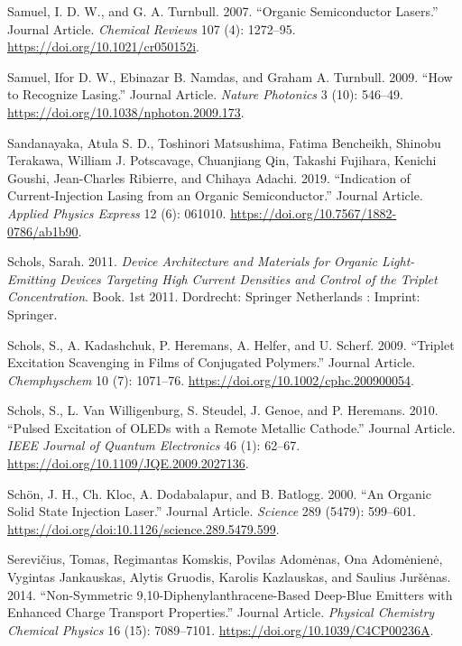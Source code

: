 \documentclass[
  letterpaper,
  DIV=11,
  numbers=noendperiod,
  oneside]{scrreprt}
\newlength{\cslhangindent}
\newlength{\cslentryspacingunit} %
\newenvironment{CSLReferences}[2] %
 {%
  \setlength{\parindent}{0pt}
  \ifodd #1
  \let\oldpar\par
  \def\par{\hangindent=\cslhangindent\oldpar}
  \fi
  \setlength{\parskip}{#2\cslentryspacingunit}
 }%
 {}
\begin{document}
\begin{CSLReferences}{1}{0}
\leavevmode{}%
Samuel, I. D. W., and G. A. Turnbull. 2007. {``Organic Semiconductor
Lasers.''} Journal Article. \emph{Chemical Reviews} 107 (4): 1272--95.
\url{https://doi.org/10.1021/cr050152i}.

\leavevmode{}%
Samuel, Ifor D. W., Ebinazar B. Namdas, and Graham A. Turnbull. 2009.
{``How to Recognize Lasing.''} Journal Article. \emph{Nature Photonics}
3 (10): 546--49. \url{https://doi.org/10.1038/nphoton.2009.173}.

\leavevmode{}%
Sandanayaka, Atula S. D., Toshinori Matsushima, Fatima Bencheikh,
Shinobu Terakawa, William J. Potscavage, Chuanjiang Qin, Takashi
Fujihara, Kenichi Goushi, Jean-Charles Ribierre, and Chihaya Adachi.
2019. {``Indication of Current-Injection Lasing from an Organic
Semiconductor.''} Journal Article. \emph{Applied Physics Express} 12
(6): 061010. \url{https://doi.org/10.7567/1882-0786/ab1b90}.

\leavevmode{}%
Schols, Sarah. 2011. \emph{Device Architecture and Materials for Organic
Light-Emitting Devices Targeting High Current Densities and Control of
the Triplet Concentration}. Book. 1st 2011. Dordrecht: Springer
Netherlands : Imprint: Springer.

\leavevmode{}%
Schols, S., A. Kadashchuk, P. Heremans, A. Helfer, and U. Scherf. 2009.
{``Triplet Excitation Scavenging in Films of Conjugated Polymers.''}
Journal Article. \emph{Chemphyschem} 10 (7): 1071--76.
\url{https://doi.org/10.1002/cphc.200900054}.

\leavevmode{}%
Schols, S., L. Van Willigenburg, S. Steudel, J. Genoe, and P. Heremans.
2010. {``Pulsed Excitation of OLEDs with a Remote Metallic Cathode.''}
Journal Article. \emph{IEEE Journal of Quantum Electronics} 46 (1):
62--67. \url{https://doi.org/10.1109/JQE.2009.2027136}.

\leavevmode{}%
Schön, J. H., Ch. Kloc, A. Dodabalapur, and B. Batlogg. 2000. {``An
Organic Solid State Injection Laser.''} Journal Article. \emph{Science}
289 (5479): 599--601.
\url{https://doi.org/doi:10.1126/science.289.5479.599}.

\leavevmode{}%
Serevičius, Tomas, Regimantas Komskis, Povilas Adomėnas, Ona Adomėnienė,
Vygintas Jankauskas, Alytis Gruodis, Karolis Kazlauskas, and Saulius
Juršėnas. 2014. {``Non-Symmetric 9,10-Diphenylanthracene-Based Deep-Blue
Emitters with Enhanced Charge Transport Properties.''} Journal Article.
\emph{Physical Chemistry Chemical Physics} 16 (15): 7089--7101.
\url{https://doi.org/10.1039/C4CP00236A}.


\end{CSLReferences}
\end{document}
